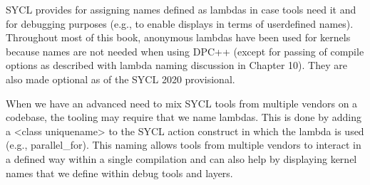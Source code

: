 SYCL provides for assigning names defined as lambdas in case tools need it and for debugging purposes (e.g., to enable displays in terms of userdefined names). Throughout most of this book, anonymous lambdas have been used for kernels because names are not needed when using DPC++ (except for passing of compile options as described with lambda naming discussion in Chapter 10). They are also made optional as of the SYCL 2020 provisional.\par

When we have an advanced need to mix SYCL tools from multiple vendors on a codebase, the tooling may require that we name lambdas. This is done by adding a <class uniquename> to the SYCL action construct in which the lambda is used (e.g., parallel\_for). This naming allows tools from multiple vendors to interact in a defined way within a single compilation and can also help by displaying kernel names that we define within debug tools and layers.\par